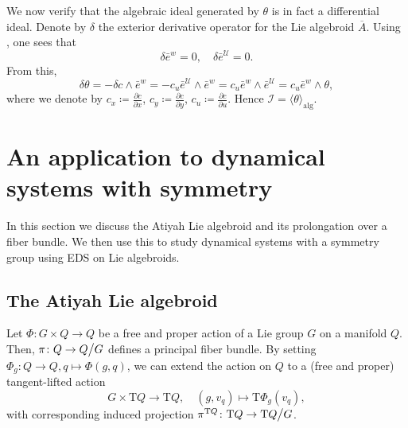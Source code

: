 \documentclass[11pt]{article}
\theoremstyle{plain}
\theoremstyle{definition}
\begin{document}
We now verify that the algebraic ideal generated by $\theta$ is in fact a differential ideal. Denote by $\delta$ the exterior derivative operator for the Lie algebroid $\overline{A}$. Using , one sees that
\begin{equation*}
    \delta \bar{e}^w=0,\quad \delta \bar{e}^{\mathcal{U}}=0.
\end{equation*}
From this,
\begin{equation*}
    \delta \theta=-\delta c\wedge \bar{e}^w =-c_u \bar{e}^{\mathcal{U}}\wedge \bar{e}^w =c_u \bar{e}^w\wedge \bar{e}^{\mathcal{U}}=c_u \bar{e}^w\wedge \theta,
\end{equation*}
where we denote by $c_x\coloneqq \frac{\partial c}{\partial x}$, $c_y\coloneqq \frac{\partial c}{\partial y}$, $c_u\coloneqq \frac{\partial c}{\partial u}$. Hence $\mathcal{I}=\langle \theta\rangle_{\mathrm{alg}}$.  



\section{An application to dynamical systems with symmetry}\label{sec:symmetry}
In this section we discuss the Atiyah Lie algebroid and its prolongation over a fiber bundle. We then use this to study dynamical systems with a symmetry group using EDS on Lie algebroids.


\subsection{The Atiyah Lie algebroid} \label{sec:atiyahalgebroid}

Let $\Phi\colon G\times Q\to Q$ be a free and proper action of a Lie group $G$ on a manifold $Q$. Then, $\pi\colon Q\to Q\big\slash G$ defines a principal fiber bundle. By setting $\Phi_g\colon Q\to Q, q\mapsto \Phi(g,q)$, we can extend the action on $Q$ to a (free and proper) tangent-lifted action 
\begin{equation*}
    G\times \mathrm{T}Q\longrightarrow \mathrm{T}Q,\quad (g,v_q)\longmapsto \mathrm{T}\Phi_g(v_{q}),
\end{equation*}
with corresponding induced projection $\pi^{\mathrm{T}Q}\colon \mathrm{T}Q\to \mathrm{T}Q\big\slash G$.
\end{document}
